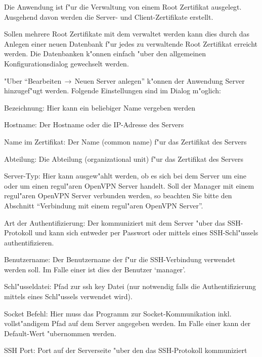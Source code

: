 
\nl Die Anwendung ist f"ur die Verwaltung von einem Root Zertifikat ausgelegt. Ausgehend davon
werden die Server- und Client-Zertifikate erstellt.

\nl Sollen mehrere Root Zertifikate mit dem \Nbm{} verwaltet werden kann dies durch das Anlegen
einer neuen Datenbank f"ur jedes zu verwaltende Root Zertifikat erreicht werden. Die Datenbanken k"onnen
einfach "uber den allgemeinen Konfigurationsdialog gewechselt werden.


\nl "Uber ``Bearbeiten$\,\rightarrow\,$Neuen Server anlegen'' k"onnen der
Anwendung Server hinzugef"ugt werden. Folgende Einstellungen sind im
Dialog m"oglich:

\begin{items}
	\item Bezeichnung: Hier kann ein beliebiger Name vergeben werden
	\item Hostname: Der Hostname oder die IP-Adresse des Servers
	\item Name im Zertifikat: Der Name (common name) f"ur das Zertifikat des Servers
	\item Abteilung: Die Abteilung (organizational unit) f"ur das Zertifikat des Servers
	\item Server-Typ: Hier kann ausgew"ahlt werden, ob es sich bei dem Server
	      um eine \Nboa{} oder um einen regul"aren OpenVPN
	      Server handelt. Soll der Manager mit einem regul"aren OpenVPN
	      Server verbunden werden, so beachten Sie bitte den Abschnitt
	      ``Verbindung mit einem regul"aren OpenVPN Server''.
	\item Art der Authentifizierung: Der  \Nbm{} kommuniziert mit dem
         Server "uber das SSH-Protokoll und kann sich entweder per
	      Passwort oder mittels eines SSH-Schl"ussels authentifizieren.
	\item Benutzername: Der Benutzername der f"ur die SSH-Verbindung
	      verwendet werden soll. Im Falle einer \Nboa{} ist dies der
	      Benutzer `manager'.
	\item Schl"usseldatei: Pfad zur ssh key Datei (nur notwendig falls
	      die Authentifizierung mittels eines Schl"ussels verwendet wird).
	\item Socket Befehl: Hier muss das Programm zur Socket-Kommunikation
	      inkl. vollst"andigem Pfad auf dem Server angegeben werden. Im
	      Falle einer \Nboa{} kann der Default-Wert "ubernommen werden.
	\item SSH Port: Port auf der Serverseite "uber den das SSH-Protokoll kommuniziert

\end{items}
